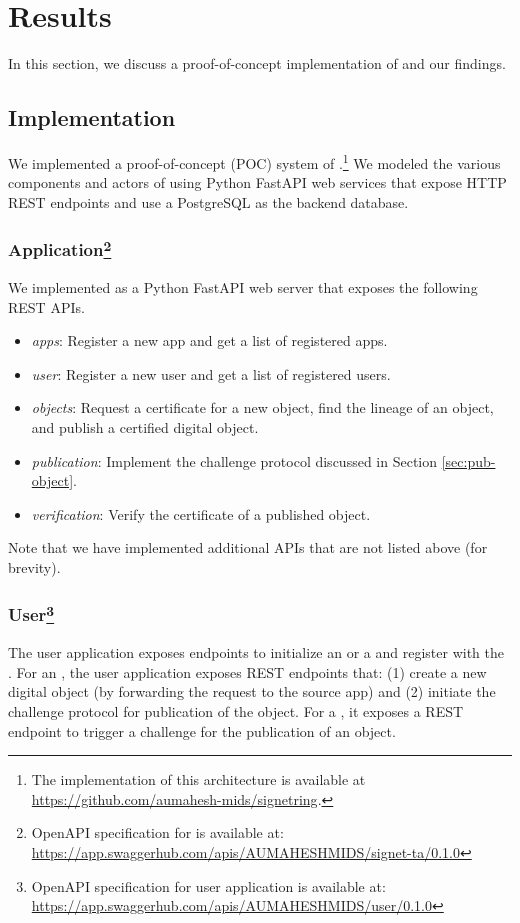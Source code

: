 \section{Results}
\label{sec:results}

In this section, we discuss a proof-of-concept implementation of \name and our findings. 

\subsection{Implementation}
\label{sec:impl}

We implemented a proof-of-concept (POC) system of \name.\footnote{The implementation of this architecture is available at \url{https://github.com/aumahesh-mids/signetring}.} We modeled the various components and actors of \name using Python FastAPI \cite{fastapi} web services that expose HTTP REST \cite{rest} endpoints and use a PostgreSQL as the backend database. 

\subsubsection{\TA Application\footnote{OpenAPI specification for \ta is available at: \url{https://app.swaggerhub.com/apis/AUMAHESHMIDS/signet-ta/0.1.0}}}
We implemented \ta as a Python FastAPI web server that exposes the following REST APIs. 

\begin{itemize}
    \item {\em apps}: Register a new app and get a list of registered apps. 
    \item {\em user}: Register a new user and get a list of registered users. 
    \item {\em objects}: Request a certificate for a new object, find the lineage of an object, and publish a certified digital object. 
    \item {\em publication}: Implement the challenge protocol discussed in Section \ref{sec:pub-object}.
    \item {\em verification}: Verify the certificate of a published object. 
\end{itemize}

Note that we have implemented additional APIs that are not listed above (for brevity).

\subsubsection{User\footnote{OpenAPI specification for user application is available at: \url{https://app.swaggerhub.com/apis/AUMAHESHMIDS/user/0.1.0}}}
The user application exposes endpoints to initialize an \owner or a \publisher and register with the \ta. For an \owner, the user application exposes REST endpoints that: (1) create a new digital object (by forwarding the request to the source app) and (2) initiate the challenge protocol for publication of the object. For a \publisher, it exposes a REST endpoint to trigger a challenge for the publication of an object. 

